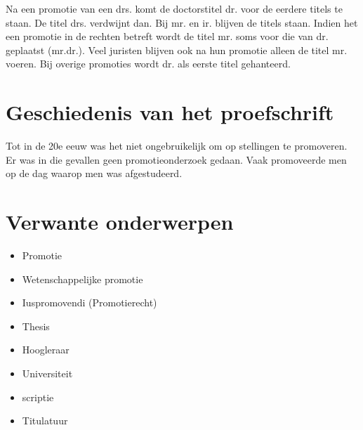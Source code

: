 Na een promotie van een drs. komt de doctorstitel dr. voor de eerdere
titels te staan. De titel drs. verdwijnt dan. Bij mr. en ir. blijven
de titels staan. Indien het een promotie in de rechten betreft wordt
de titel mr. soms voor die van dr. geplaatst (mr.dr.). Veel juristen
blijven ook na hun promotie alleen de titel mr. voeren. Bij overige
promoties wordt dr. als eerste titel gehanteerd.

\section{Geschiedenis van het proefschrift}
\label{sec:geschiedenis-van-het}


Tot in de 20e eeuw was het niet ongebruikelijk om op stellingen te
promoveren. Er was in die gevallen geen promotieonderzoek gedaan. Vaak
promoveerde men op de dag waarop men was afgestudeerd.

\section{Verwante onderwerpen}
\label{sec:verwante-onderwerpen}

\begin{itemize}
\item Promotie~\cite{h2g2}
\item Wetenschappelijke promotie
\item Iuspromovendi (Promotierecht)
\item Thesis
\item Hoogleraar
\item Universiteit
\item scriptie\cite{pratchett06:_good_omens}
\item Titulatuur
\end{itemize}


